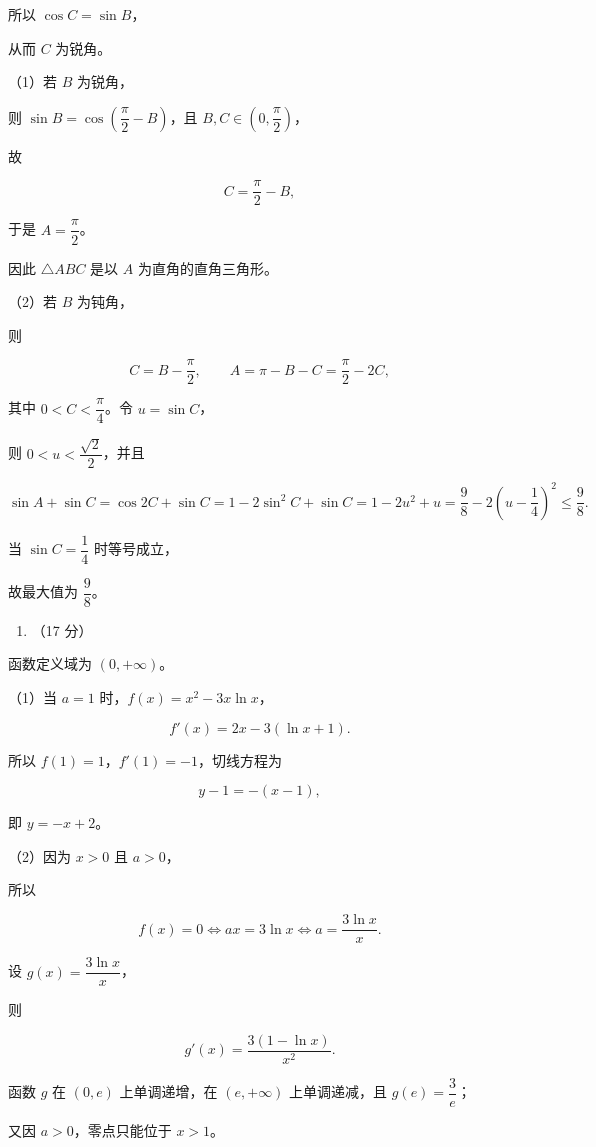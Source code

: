 \documentclass[UTF8,12pt,a4paper]{ctexart}
\renewcommand{\labelenumi}{\arabic{enumi}.}
\providecommand{\tightlist}{%
  \setlength{\itemsep}{0pt}\setlength{\parskip}{0pt}}
\begin{document}
所以 \(\cos C=\sin B\)，

从而 \(C\) 为锐角。

（1）若 \(B\) 为锐角，

则 \(\sin B=\cos\left(\dfrac\pi2-B\right)\)，且 \(B,C\in\left(0,\dfrac\pi2\right)\)，

故

\[
   C=\frac\pi2-B,
   \]

于是 \(A=\dfrac\pi2\)。

因此 \(\triangle ABC\) 是以 \(A\) 为直角的直角三角形。

（2）若 \(B\) 为钝角，

则

\[
   C=B-\frac\pi2,
   \qquad
   A=\pi-B-C=\frac\pi2-2C,
   \]

其中 \(0<C<\dfrac\pi4\)。令 \(u=\sin C\)，

则 \(0<u<\dfrac{\sqrt2}{2}\)，并且

\[
   \sin A+\sin C=\cos2C+\sin C
   =1-2\sin^2C+\sin C
   =1-2u^2+u
   =\frac98-2\left(u-\frac14\right)^2\le\frac98.
   \]

当 \(\sin C=\dfrac14\) 时等号成立，

故最大值为 \(\dfrac98\)。

\begin{enumerate}
\def\labelenumi{\arabic{enumi}.}
\setcounter{enumi}{17}
\tightlist
\item
  （17 分）
\end{enumerate}

函数定义域为 \((0,+\infty)\)。

（1）当 \(a=1\) 时，\(f(x)=x^2-3x\ln x\)，

\[
   f'(x)=2x-3(\ln x+1).
   \]

所以 \(f(1)=1\)，\(f'(1)=-1\)，切线方程为

\[
   y-1=-(x-1),
   \]

即 \(y=-x+2\)。

（2）因为 \(x>0\) 且 \(a>0\)，

所以

\[
   f(x)=0\iff ax=3\ln x\iff a=\dfrac{3\ln x}{x}.
   \]

设 \(g(x)=\dfrac{3\ln x}{x}\)，

则

\[
   g'(x)=\dfrac{3(1-\ln x)}{x^2}.
   \]

函数 \(g\) 在 \((0,e)\) 上单调递增，在 \((e,+\infty)\) 上单调递减，且 \(g(e)=\dfrac3e\)；

又因 \(a>0\)，零点只能位于 \(x>1\)。
\end{document}
